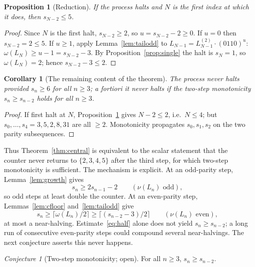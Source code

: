 \documentclass[11pt,reqno]{amsart}
\theoremstyle{plain}
\newtheorem{proposition}{Proposition}
\newtheorem{corollary}{Corollary}
\theoremstyle{definition}
\theoremstyle{remark}
\newtheorem{conjecture}{Conjecture}
\begin{document}
\begin{proposition}[Reduction]\label{prop:firsthalt}
If the process halts and $N$ is the first index at which it does, then $s_{N-2}\le 5$.
\end{proposition}
\begin{proof}
Since $N$ is the first halt, $s_{N-2}\ge 2$, so $u=s_{N-2}-2\ge 0$. If $u=0$ then $s_{N-2}=2\le 5$. If $u\ge 1$, apply Lemma~\ref{lem:tailodd} to $L_{N-1}=L^{(2)}_{N-1}\cdot(0110)^u$: $\omega(L_N)\ge u-1=s_{N-2}-3$. By Proposition~\ref{prop:single} the halt is $s_N=1$, so $\omega(L_N)=2$; hence $s_{N-2}-3\le 2$.
\end{proof}

\begin{corollary}[The remaining content of the theorem]\label{cor:remaining}
The process never halts provided $s_n\ge 6$ for all $n\ge 3$; a fortiori it never halts if the two-step monotonicity $s_n\ge s_{n-2}$ holds for all $n\ge 3$.
\end{corollary}
\begin{proof}
If first halt at $N$, Proposition~\ref{prop:firsthalt} gives $N-2\le 2$, i.e.\ $N\le 4$; but $s_0,\dots,s_4=3,5,2,8,31$ are all $\ge 2$. Monotonicity propagates $s_0,s_1,s_2$ on the two parity subsequences.
\end{proof}

Thus Theorem~\ref{thm:central} is equivalent to the scalar statement that the counter never returns to $\{2,3,4,5\}$ after the third step, for which two-step monotonicity is sufficient. The mechanism is explicit. At an odd-parity step, Lemma~\ref{lem:growth} gives
\begin{equation}\label{eq:double}
s_n\ge 2s_{n-1}-2\qquad(\nu(L_n)\text{ odd}),
\end{equation}
so odd steps at least double the counter. At an even-parity step, Lemmas~\ref{lem:cfloor} and~\ref{lem:tailodd} give
\begin{equation}\label{eq:half}
s_n\ge\lceil\omega(L_n)/2\rceil\ge\lceil(s_{n-2}-3)/2\rceil\qquad(\nu(L_n)\text{ even}),
\end{equation}
at most a near-halving. Estimate~\eqref{eq:half} alone does not yield $s_n\ge s_{n-2}$; a long run of consecutive even-parity steps could compound several near-halvings. The next conjecture asserts this never happens.

\begin{conjecture}[Two-step monotonicity; open]\label{conj:mono}
For all $n\ge 3$, $s_n\ge s_{n-2}$.
\end{conjecture}
\end{document}
